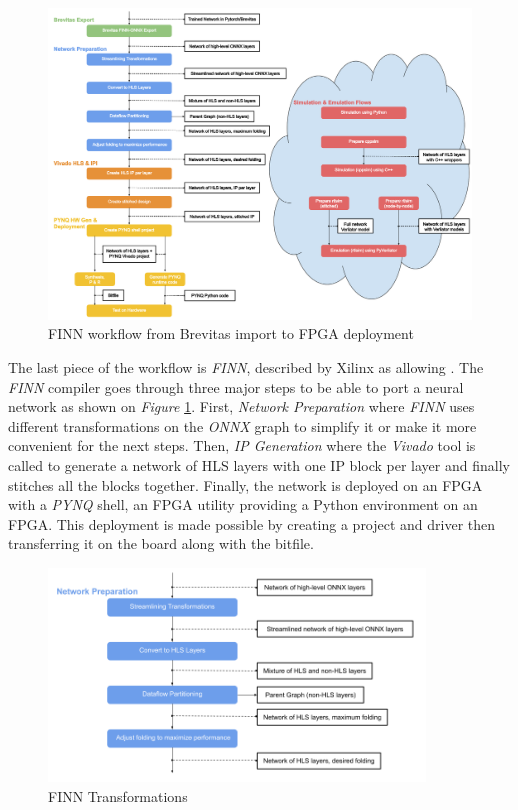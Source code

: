 \begin{figure}[htbp]
	\centering
		\includegraphics[width=16cm]{Figures/FINNWholeFlow.png}
	\caption[FINN whole flow]{FINN workflow from Brevitas import to FPGA deployment}
	\label{fig:FINNWholeFlow}
\end{figure}

The last piece of the workflow is \emph{FINN}, described by Xilinx as allowing . The \emph{FINN} compiler goes through three major steps to be able to port a neural network as shown on \emph{Figure} \ref{fig:FINNWholeFlow}. First, \emph{Network Preparation} where \emph{FINN} uses different transformations on the \emph{ONNX} graph to simplify it or make it more convenient for the next steps. Then, \emph{IP Generation} where the \emph{Vivado} tool is called to generate a network of HLS layers with one IP block per layer and finally stitches all the blocks together. Finally, the network is deployed on an FPGA with a \emph{PYNQ} shell, an FPGA utility providing a Python environment on an FPGA. This deployment is made possible by creating a project and driver then transferring it on the board along with the bitfile.

\begin{figure}[htbp]
	\centering
		\includegraphics[width=10cm]{Figures/FINNTransformations.png}
	\caption[FINN Transformations]{FINN Transformations}
	\label{fig:FINNTransformations}
\end{figure}

